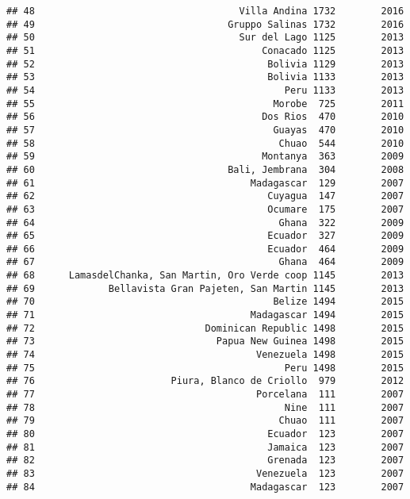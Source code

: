 \documentclass[
]{article}
\begin{document}
\begin{verbatim}
## 48                                    Villa Andina 1732        2016
## 49                                  Gruppo Salinas 1732        2016
## 50                                    Sur del Lago 1125        2013
## 51                                        Conacado 1125        2013
## 52                                         Bolivia 1129        2013
## 53                                         Bolivia 1133        2013
## 54                                            Peru 1133        2013
## 55                                          Morobe  725        2011
## 56                                        Dos Rios  470        2010
## 57                                          Guayas  470        2010
## 58                                           Chuao  544        2010
## 59                                        Montanya  363        2009
## 60                                  Bali, Jembrana  304        2008
## 61                                      Madagascar  129        2007
## 62                                         Cuyagua  147        2007
## 63                                         Ocumare  175        2007
## 64                                           Ghana  322        2009
## 65                                         Ecuador  327        2009
## 66                                         Ecuador  464        2009
## 67                                           Ghana  464        2009
## 68      LamasdelChanka, San Martin, Oro Verde coop 1145        2013
## 69             Bellavista Gran Pajeten, San Martin 1145        2013
## 70                                          Belize 1494        2015
## 71                                      Madagascar 1494        2015
## 72                              Dominican Republic 1498        2015
## 73                                Papua New Guinea 1498        2015
## 74                                       Venezuela 1498        2015
## 75                                            Peru 1498        2015
## 76                        Piura, Blanco de Criollo  979        2012
## 77                                       Porcelana  111        2007
## 78                                            Nine  111        2007
## 79                                           Chuao  111        2007
## 80                                         Ecuador  123        2007
## 81                                         Jamaica  123        2007
## 82                                         Grenada  123        2007
## 83                                       Venezuela  123        2007
## 84                                      Madagascar  123        2007

\end{verbatim}
\end{document}
